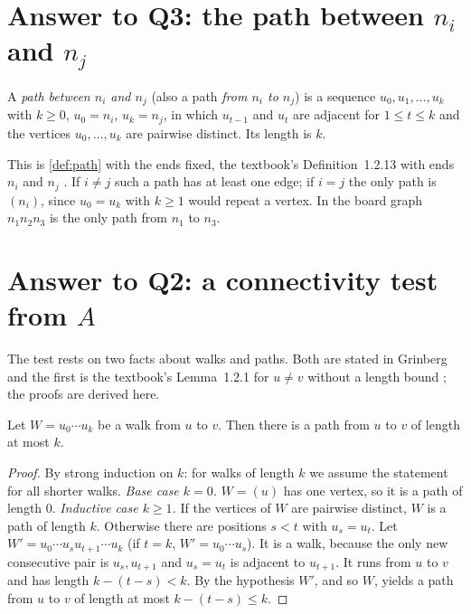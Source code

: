 \section{Answer to Q3: the path between $n_i$ and $n_j$}\label{sec:q3}

\begin{definition}\label{def:pathbetween}
A \emph{path between $n_i$ and $n_j$} (also a path \emph{from $n_i$ to $n_j$})
is a sequence $u_0,u_1,\dots,u_k$ with $k\ge 0$, $u_0=n_i$, $u_k=n_j$, in
which $u_{t-1}$ and $u_t$ are adjacent for $1\le t\le k$ and the vertices
$u_0,\dots,u_k$ are pairwise distinct. Its length is $k$.
\end{definition}
This is \cref{def:path} with the ends fixed, the textbook's
Definition~1.2.13 with ends $n_i$ and $n_j$
\cite[p.~22]{petrosyan2015graphs}. If $i\ne j$ such a path has at least one
edge; if $i=j$ the only path is $(n_i)$, since $u_0=u_k$ with $k\ge 1$ would
repeat a vertex. In the board graph $n_1n_2n_3$ is the only path from $n_1$ to $n_3$.

\section{Answer to Q2: a connectivity test from $A$}\label{sec:q2}

The test rests on two facts about walks and paths. Both are stated in
Grinberg \cite[Corollary~2.9.7, p.~39; Section~2.9.4, p.~40]{grinberg2025graph}
and the first is the textbook's Lemma~1.2.1 for $u\ne v$ without a length
bound \cite[p.~23]{petrosyan2015graphs}; the proofs are derived here.

\begin{lemma}\label{lem:cut}
Let $W=u_0\cdots u_k$ be a walk from $u$ to $v$. Then there is a path from $u$
to $v$ of length at most $k$.
\end{lemma}
\begin{proof}
By strong induction on $k$: for walks of length $k$ we assume the statement
for all shorter walks. \emph{Base case $k=0$.} $W=(u)$ has one vertex, so it
is a path of length $0$. \emph{Inductive case $k\ge 1$.} If the vertices of $W$
are pairwise distinct, $W$ is a path of length $k$. Otherwise there are
positions $s<t$ with $u_s=u_t$. Let $W'=u_0\cdots u_su_{t+1}\cdots u_k$
(if $t=k$, $W'=u_0\cdots u_s$). It is a walk, because the only new
consecutive pair is $u_s,u_{t+1}$ and $u_s=u_t$ is adjacent to $u_{t+1}$. It
runs from $u$ to $v$ and has length $k-(t-s)<k$. By the hypothesis $W'$, and so
$W$, yields a path from $u$ to $v$ of length at most $k-(t-s)\le k$.
\end{proof}

